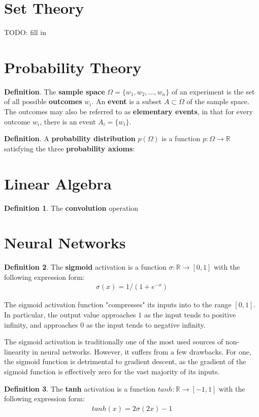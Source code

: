 \documentclass[12pt, titlepage]{report}
\theoremstyle{definition}
\newtheorem{definition}{Definition}
\begin{document}
\section{Set Theory}
TODO: fill in 
\section{Probability Theory}
\textbf{Definition}. The \textbf{sample space} $\Omega = \{w_1, w_2, ..., w_n\}$ of an experiment is the set of all possible \textbf{outcomes} $w_i$. An \textbf{event} is a subset $A \subset \Omega$ of the sample space. The outcomes may also be referred to as \textbf{elementary events}, in that for every outcome $w_i$, there is an event $A_i = \{w_i\}$.

\textbf{Definition}. A \textbf{probability distribution} $p(\Omega)$ is a function $p : \Omega \rightarrow \mathbb{R}$ satisfying the three \textbf{probability axioms}:
\section{Linear Algebra}
\begin{definition}
The \textbf{convolution} operation
\end{definition}

\section{Neural Networks}
\begin{definition}
The \textbf{sigmoid} activation is a function $\sigma : \mathbb{R} \rightarrow [0, 1]$ with the following expression form:
\begin{gather}\label{eq:sigmoid}
\sigma(x)=1/(1 + {e^{-x}})
\end{gather}

The sigmoid activation function "compresses" its inputs into to the range $[0, 1]$. In particular, the output value approaches $1$ as the input tends to positive infinity, and approaches $0$ as the input tends to negative infinity.
\end{definition}

The sigmoid activation is traditionally one of the most used sources of non-linearity in neural networks. However, it suffers from a few drawbacks. For one, the sigmoid function is detrimental to gradient descent, as the gradient of the sigmoid function is effectively zero for the vast majority of its inputs.

\begin{definition}
The \textbf{tanh} activation is a function $tanh: \mathbb{R} \rightarrow [-1, 1]$ with the following expression form:
\begin{gather}\label{eq:tanh}
tanh(x)=2\sigma(2x)-1
\end{gather}
\end{definition}
\end{document}
